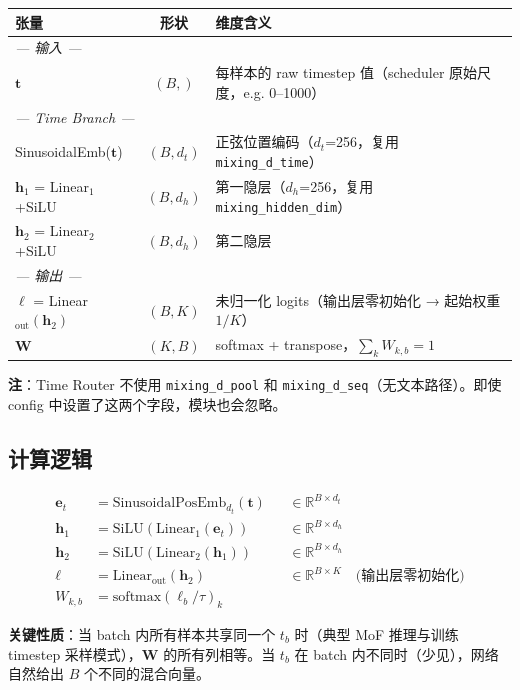 \documentclass[11pt,a4paper]{article}
\newcommand{\softmax}{\mathrm{softmax}}
\newcommand{\R}{\mathbb{R}}
\begin{document}
\begin{center}
\small
\begin{tabular}{lcp{7.5cm}}
\toprule
\textbf{张量} & \textbf{形状} & \textbf{维度含义} \\
\midrule
\multicolumn{3}{l}{\textit{--- 输入 ---}} \\
$\mathbf{t}$ & $(B,)$ & 每样本的 raw timestep 值（scheduler 原始尺度，e.g. 0--1000） \\
\midrule
\multicolumn{3}{l}{\textit{--- Time Branch ---}} \\
SinusoidalEmb($\mathbf{t}$) & $(B, d_t)$ & 正弦位置编码（$d_t$=256，复用 \texttt{mixing\_d\_time}） \\
$\mathbf{h}_1$ = Linear$_1$+SiLU & $(B, d_h)$ & 第一隐层（$d_h$=256，复用 \texttt{mixing\_hidden\_dim}） \\
$\mathbf{h}_2$ = Linear$_2$+SiLU & $(B, d_h)$ & 第二隐层 \\
\midrule
\multicolumn{3}{l}{\textit{--- 输出 ---}} \\
$\bm{\ell}$ = Linear$_{\text{out}}(\mathbf{h}_2)$ & $(B, K)$ & 未归一化 logits（输出层零初始化 → 起始权重 $1/K$） \\
$\mathbf{W}$ & $(K, B)$ & softmax + transpose，$\sum_k W_{k,b} = 1$ \\
\bottomrule
\end{tabular}
\end{center}

\textbf{注}：Time Router 不使用 \texttt{mixing\_d\_pool} 和 \texttt{mixing\_d\_seq}（无文本路径）。即使 config 中设置了这两个字段，模块也会忽略。

\subsection{计算逻辑}

\begin{align}
\mathbf{e}_t &= \text{SinusoidalPosEmb}_{d_t}(\mathbf{t}) && \in \R^{B \times d_t} \\
\mathbf{h}_1 &= \text{SiLU}(\text{Linear}_1(\mathbf{e}_t)) && \in \R^{B \times d_h} \\
\mathbf{h}_2 &= \text{SiLU}(\text{Linear}_2(\mathbf{h}_1)) && \in \R^{B \times d_h} \\
\bm{\ell} &= \text{Linear}_{\text{out}}(\mathbf{h}_2) && \in \R^{B \times K} \quad \text{(输出层零初始化)} \\
W_{k,b} &= \softmax(\bm{\ell}_b / \tau)_k
\end{align}

\textbf{关键性质}：当 batch 内所有样本共享同一个 $t_b$ 时（典型 MoF 推理与训练 timestep 采样模式），$\mathbf{W}$ 的所有列相等。当 $t_b$ 在 batch 内不同时（少见），网络自然给出 $B$ 个不同的混合向量。
\end{document}
